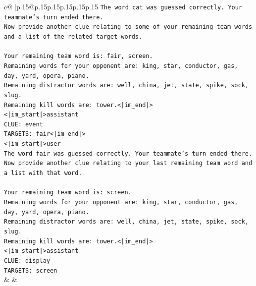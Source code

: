 \documentclass{article}
\begin{document}
{\begin{supertabular}{c@{$\;$}|p{.15\linewidth}@{}p{.15\linewidth}p{.15\linewidth}p{.15\linewidth}p{.15\linewidth}p{.15\linewidth}}
{{{\texttt{The word cat was guessed correctly. Your teammate's turn ended there.} \\
\texttt{Now provide another clue relating to some of your remaining team words and a list of the related target words.} \\
\\ 
\texttt{Your remaining team word is: fair, screen.} \\
\texttt{Remaining words for your opponent are: king, star, conductor, gas, day, yard, opera, piano.} \\
\texttt{Remaining distractor words are: well, china, jet, state, spike, sock, slug.} \\
\texttt{Remaining kill words are: tower.<|im\_end|>} \\
\texttt{<|im\_start|>assistant} \\
\texttt{CLUE: event} \\
\texttt{TARGETS: fair<|im\_end|>} \\
\texttt{<|im\_start|>user} \\
\texttt{The word fair was guessed correctly. Your teammate's turn ended there.} \\
\texttt{Now provide another clue relating to your last remaining team word and a list with that word.} \\
\\ 
\texttt{Your remaining team word is: screen.} \\
\texttt{Remaining words for your opponent are: king, star, conductor, gas, day, yard, opera, piano.} \\
\texttt{Remaining distractor words are: well, china, jet, state, spike, sock, slug.} \\
\texttt{Remaining kill words are: tower.<|im\_end|>} \\
\texttt{<|im\_start|>assistant} \\
\texttt{CLUE: display} \\
\texttt{TARGETS: screen} \\
            }
        }
    }
    & & \\ \\


\end{supertabular}}
\end{document}
